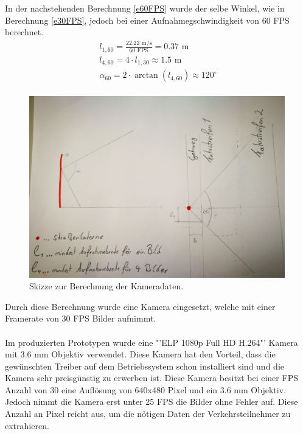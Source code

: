 In der nachstehenden Berechnung \eqref{e60FPS} wurde der selbe Winkel, wie in Berechnung \eqref{e30FPS}, jedoch bei einer Aufnahmegschwindigkeit von 60 FPS berechnet.
\begin{equation}
\begin{split}
l_{ 1,60 } = \frac{ 22.22 \text{ m/s} }{ 60 \text{ FPS}} = 0.37 \text{ m}\\ 
l_{ 4,60 } = 4 \cdot l_{1,30} \approx 1.5 \text{ m}\\
\alpha_{60} = 2 \cdot \arctan(l_{4,60 }) \approx 120^\circ \\
\label{e60FPS}
\end{split}
\end{equation}
\begin{figure}[H]
  \centering
  \includegraphics[width=0.99\textwidth]{Hardware/ObjektivBerechnung.jpg} 
  \caption{Skizze zur Berechnung der Kameradaten.}
  \label{bBerechnung}
\end{figure}

Durch diese Berechnung wurde eine Kamera eingesetzt, welche mit einer Framerate von 30 FPS Bilder aufnimmt. \\\\
Im produzierten Prototypen wurde eine "'ELP 1080p Full HD H.264"' Kamera mit 3.6 mm Objektiv verwendet. Diese Kamera hat den Vorteil, dass die gewünschten Treiber auf dem Betriebssystem schon installiert sind und die Kamera sehr preisgünstig zu erwerben ist. Diese Kamera besitzt bei einer FPS Anzahl von 30 eine Auflösung von 640x480 Pixel und ein 3.6 mm Objektiv. Jedoch nimmt die Kamera erst unter 25 FPS die Bilder ohne Fehler auf. Diese Anzahl an Pixel reicht aus, um die nötigen Daten der Verkehrsteilnehmer zu extrahieren. \cite{Kamera}

